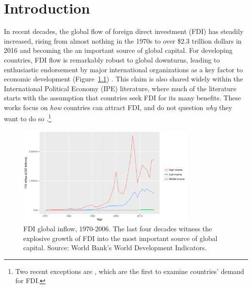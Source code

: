 \chapter{Introduction}

In recent decades, the global flow of foreign direct investment (FDI) has
steadily increased, rising from almost nothing in the 1970s to over \$2.3
trillion dollars in 2016 and becoming the an important source of global capital. For developing countries, FDI flow is remarkably robust to
global downturns, leading to enthusiastic endorsement by major international
organizations as a key factor to economic development
(Figure~\ref{fig:globalfdi}) \citep{Mallampally1999, WorldEconomicForum2013}.
This claim is also shared widely within the International Political Economy
(IPE) literature, where much of the
literature starts with the assumption that countries seek FDI for its many
benefits. These works focus on \textit{how} countries can attract FDI, and do
not question \textit{why} they want to do so \citep{Jensen2003, Li2003, Li2006,
  Ahlquist2006}.\footnote{Two recent exceptions are \citet{Pinto2013,
    Pandya2016}, which are the first to examine countries' demand for FDI.} 

\begin{figure}[tbp]
  \centering
\includegraphics[width=0.8\textwidth,keepaspectratio]{../figure/global_fdi}
\caption[FDI global inflow, 1970-2006.]{FDI global inflow, 1970-2006. The last
  four decades witness the explosive growth of FDI into the most important
  source of global capital. Source: World Bank's World Development Indicators.}
\label{fig:globalfdi}
\end{figure}

